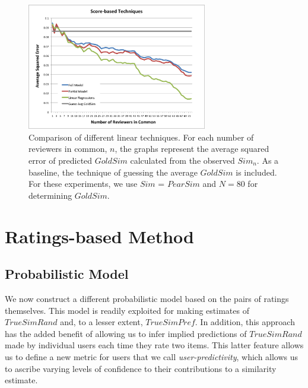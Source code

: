 \documentclass[11pt]{article}
\begin{document}
\begin{figure}[!htbp]
    \centering
    \includegraphics[width=0.7\textwidth]{LinearTechniques.png}
	\caption{Comparison of different linear techniques. For each number of
reviewers in common, $n$, the graphs represent the average squared error of
predicted $GoldSim$ calculated from the observed $Sim_n$. As a baseline, the
technique of guessing the average $GoldSim$ is included. For these experiments,
we use $Sim$ = $PearSim$ and $N=80$ for determining $GoldSim$.}
    \label{fig:Linear}
\end{figure}


\section*{Ratings-based Method}
\subsection*{Probabilistic Model}

We now construct a different probabilistic model based on the pairs of ratings
themselves. This model is readily exploited for making estimates of
$TrueSimRand$ and, to a lesser extent, $TrueSimPref$. In addition, this approach
has the added benefit of allowing us to infer implied predictions of
$TrueSimRand$ made by individual users each time they rate two items. This
latter feature allows us to define a new metric for users that we call {\em
user-predictivity}, which allows us to ascribe varying levels of confidence to
their contributions to a similarity estimate.
\end{document}
